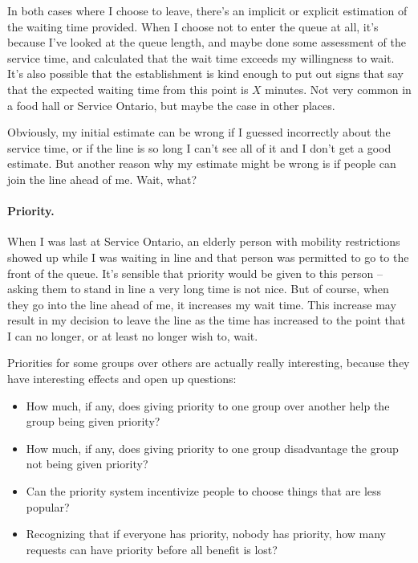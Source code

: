 In both cases where I choose to leave, there's an implicit or explicit estimation of the waiting time provided. When I choose not to enter the queue at all, it's because I've looked at the queue length, and maybe done some assessment of the service time, and calculated that the wait time exceeds my willingness to wait. It's also possible that the establishment is kind enough to put out signs that say that the expected waiting time from this point is $X$ minutes. Not very common in a food hall or Service Ontario, but maybe the case in other places.

Obviously, my initial estimate can be wrong if I guessed incorrectly about the service time, or if the line is so long I can't see all of it and I don't get a good estimate. But another reason why my estimate might be wrong is if people can join the line ahead of me. Wait, what?

\paragraph{Priority.}
When I was last at Service Ontario, an elderly person with mobility restrictions showed up while I was waiting in line and that person was permitted to go to the front of the queue. It's sensible that priority would be given to this person -- asking them to stand in line a very long time is not nice. But of course, when they go into the line ahead of me, it increases my wait time. This increase may result in my decision to leave the line as the time has increased to the point that I can no longer, or at least no longer wish to, wait. 

Priorities for some groups over others are actually really interesting, because they have interesting effects and open up questions:

\begin{itemize}
	\item How much, if any, does giving priority to one group over another help the group being given priority?
	\item How much, if any, does giving priority to one group disadvantage the group not being given priority?
	\item Can the priority system incentivize people to choose things that are less popular?
	\item Recognizing that if everyone has priority, nobody has priority, how many requests can have priority before all benefit is lost?
\end{itemize}



